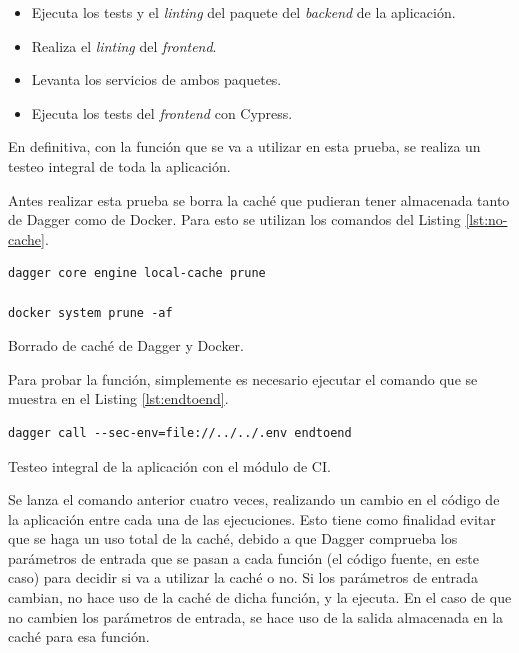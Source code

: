 \begin{itemize}
  \item Ejecuta los tests y el \textit{linting} del paquete del \textit{backend} de la aplicación.
  \item Realiza el \textit{linting} del \textit{frontend}.
  \item Levanta los servicios de ambos paquetes.
  \item Ejecuta los tests del \textit{frontend} con Cypress.
\end{itemize}

En definitiva, con la función que se va a utilizar en esta prueba, se realiza un testeo integral de toda la aplicación.

Antes realizar esta prueba se borra la caché que pudieran tener almacenada tanto de Dagger como de Docker. Para esto se utilizan los comandos del Listing \ref{lst:no-cache}.

\begin{listing}[!ht]
  \begin{verbatim}
dagger core engine local-cache prune

docker system prune -af
\end{verbatim}
\caption{Borrado de caché de Dagger y Docker.}
\label{lst:no-cache}
\end{listing}

Para probar la función, simplemente es necesario ejecutar el comando que se muestra en el Listing \ref{lst:endtoend}.

\begin{listing}[!ht]
  \begin{verbatim}
dagger call --sec-env=file://../../.env endtoend
\end{verbatim}
\caption{Testeo integral de la aplicación con el módulo de CI.}
\label{lst:endtoend}
\end{listing}

Se lanza el comando anterior cuatro veces, realizando un cambio en el código de la aplicación entre cada una de las ejecuciones. Esto tiene como finalidad evitar que se haga un uso total de la caché, debido a que Dagger comprueba los parámetros de entrada que se pasan a cada función (el código fuente, en este caso) para decidir si va a utilizar la caché o no. Si los parámetros de entrada cambian, no hace uso de la caché de dicha función, y la ejecuta. En el caso de que no cambien los parámetros de entrada, se hace uso de la salida almacenada en la caché para esa función.

